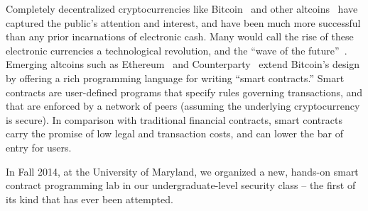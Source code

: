 \documentclass{llncs}
\newcommand{\elaine}[1]{}
\newcommand{\ignore}[1]{}
\begin{document}
Completely decentralized cryptocurrencies like Bitcoin~\cite{bitcoin}
and other altcoins~\cite{altcoins}
have captured the public's attention and interest, 
and have been much more successful than any prior incarnations of electronic
cash. Many would call the rise 
of these electronic currencies a technological revolution, and the ``wave of
the future''~\cite{riseandrise}.
Emerging altcoins such as Ethereum~\cite{ethereum} and Counterparty~\cite{counterparty}
extend Bitcoin's design by offering a rich programming language for 
writing ``smart contracts.'' Smart
contracts are user-defined programs that specify rules 
governing transactions, and that are enforced by
a network of peers (assuming the underlying cryptocurrency is secure). 
In comparison with traditional
financial contracts, smart contracts carry the promise of low legal 
and transaction costs, and can 
lower the bar of entry for users.

In Fall 2014, at the University of Maryland, 
we organized a new, hands-on
smart contract programming lab in 
our undergraduate-level security
class -- the first of its
kind that has ever been attempted.




\ignore{
The first part of this lab consists of step-by-step examples illustrating basic design of functional smart contracts. We highly recommend you take a hands-on approach, and interact with these smart contract examples using the Ethereum simulator! The accompanying materials to everything you need to get started with experimenting, including  a virtual machine image, basic instructions, and a language guide.

The second part of this lab focuses on designing smart contracts that achieve their intended goals, and are robust to attacks. 
Although our lab makes us of a simulator, the smart contracts you write can also be used in the live Ethereum network\footnote{At the time of this writing, the only live Ethereum network is a test network, since the main network has not yet launched.} The basic concepts we discuss apply to other cryptocurrencies as well (including Bitcoin), so most of what you learn will be transferable.
}
\end{document}
